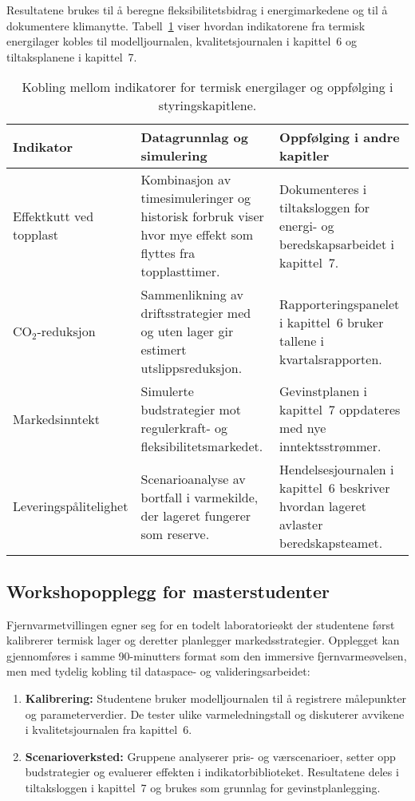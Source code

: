 Resultatene brukes til å beregne fleksibilitetsbidrag i energimarkedene og til å dokumentere klimanytte. Tabell~\ref{tab:kap04-fjernvarme-lager} viser hvordan indikatorene fra termisk energilager kobles til modelljournalen, kvalitetsjournalen i kapittel~6 og tiltaksplanene i kapittel~7.

\begin{table}[htbp]
    \centering
    \begin{tabular}{p{}p{}p{}}
        \toprule
        \textbf{Indikator} & \textbf{Datagrunnlag og simulering} & \textbf{Oppfølging i andre kapitler}\\
        \midrule
        Effektkutt ved topplast & Kombinasjon av timesimuleringer og historisk forbruk viser hvor mye effekt som flyttes fra topplasttimer. & Dokumenteres i tiltaksloggen for energi- og beredskapsarbeidet i kapittel~7.\\
        CO$_2$-reduksjon & Sammenlikning av driftsstrategier med og uten lager gir estimert utslippsreduksjon. & Rapporteringspanelet i kapittel~6 bruker tallene i kvartalsrapporten.\\
        Markedsinntekt & Simulerte budstrategier mot regulerkraft- og fleksibilitetsmarkedet. & Gevinstplanen i kapittel~7 oppdateres med nye inntektsstrømmer.\\
        Leveringspålitelighet & Scenarioanalyse av bortfall i varmekilde, der lageret fungerer som reserve. & Hendelsesjournalen i kapittel~6 beskriver hvordan lageret avlaster beredskapsteamet.\\
        \bottomrule
    \end{tabular}
    \caption{Kobling mellom indikatorer for termisk energilager og oppfølging i styringskapitlene.}
    \label{tab:kap04-fjernvarme-lager}
\end{table}

\subsection{Workshopopplegg for masterstudenter}
Fjernvarmetvillingen egner seg for en todelt laboratorieøkt der studentene først kalibrerer termisk lager og deretter planlegger markedsstrategier. Opplegget kan gjennomføres i samme 90-minutters format som den immersive fjernvarmeøvelsen, men med tydelig kobling til dataspace- og valideringsarbeidet:
\begin{enumerate}
    \item \textbf{Kalibrering:} Studentene bruker modelljournalen til å registrere målepunkter og parameterverdier. De tester ulike varmeledningstall og diskuterer avvikene i kvalitetsjournalen fra kapittel~6.
    \item \textbf{Scenarioverksted:} Gruppene analyserer pris- og værscenarioer, setter opp budstrategier og evaluerer effekten i indikatorbiblioteket. Resultatene deles i tiltaksloggen i kapittel~7 og brukes som grunnlag for gevinstplanlegging.
\end{enumerate}


